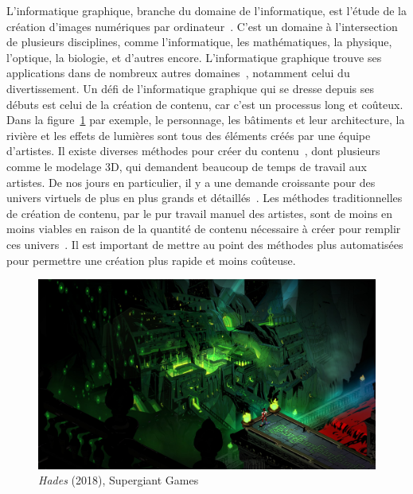 \Introduction
\label{chap:introduction}

L'informatique graphique, branche du domaine de l'informatique, est l'étude de la création d'images numériques par ordinateur~\cite{poinssac_infographie_1994}. C'est un domaine à l'intersection de plusieurs disciplines, comme l'informatique, les mathématiques, la physique, l'optique, la biologie, et d'autres encore. L'informatique graphique trouve ses applications dans de nombreux autres domaines~\cite{ekaran_when_2021}, notamment celui du divertissement. Un défi de l'informatique graphique qui se dresse depuis ses débuts est celui de la création de contenu, car c'est un processus long et coûteux. Dans la figure~\ref{fig:hades} par exemple, le personnage, les bâtiments et leur architecture, la rivière et les effets de lumières sont tous des éléments créés par une équipe d'artistes. Il existe diverses méthodes pour créer du contenu~\cite{juegoadmin_why_2023}, dont plusieurs comme le modelage 3D, qui demandent beaucoup de temps de travail aux artistes. De nos jours en particulier, il y a une demande croissante pour des univers virtuels de plus en plus grands et détaillés~\cite{imam_open_2022}. Les méthodes traditionnelles de création de contenu, par le pur travail manuel des artistes, sont de moins en moins viables en raison de la quantité de contenu nécessaire à créer pour remplir ces univers~\cite{freiknecht_survey_2017}. Il est important de mettre au point des méthodes plus automatisées pour permettre une création plus rapide et moins coûteuse.

\bigskip

\begin{figure}[!h]
    \centering
    \includegraphics[width=.85\textwidth]{contenu/resources/images/hades}
    \caption[\textit{Hades} (2018), Supergiant Games]{\textit{Hades} (2018), Supergiant Games~\cite{supergiant_hades_2018}}
    \label{fig:hades}
\end{figure}

